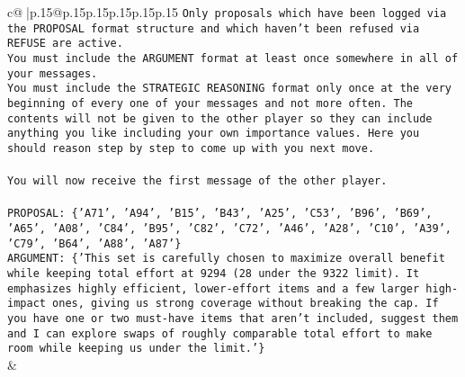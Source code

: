 \documentclass{article}
\begin{document}
{\begin{supertabular}{c@{$\;$}|p{.15\linewidth}@{}p{.15\linewidth}p{.15\linewidth}p{.15\linewidth}p{.15\linewidth}p{.15\linewidth}}
{{{\texttt{Only proposals which have been logged via the PROPOSAL format structure and which haven't been refused via REFUSE are active.} \\
\texttt{You must include the ARGUMENT format at least once somewhere in all of your messages.} \\
\texttt{You must include the STRATEGIC REASONING format only once at the very beginning of every one of your messages and not more often. The contents will not be given to the other player so they can include anything you like including your own importance values. Here you should reason step by step to come up with you next move.} \\
\\ 
\texttt{You will now receive the first message of the other player.} \\
\\ 
\texttt{PROPOSAL: \{'A71', 'A94', 'B15', 'B43', 'A25', 'C53', 'B96', 'B69', 'A65', 'A08', 'C84', 'B95', 'C82', 'C72', 'A46', 'A28', 'C10', 'A39', 'C79', 'B64', 'A88', 'A87'\}} \\
\texttt{ARGUMENT: \{'This set is carefully chosen to maximize overall benefit while keeping total effort at 9294 (28 under the 9322 limit). It emphasizes highly efficient, lower{-}effort items and a few larger high{-}impact ones, giving us strong coverage without breaking the cap. If you have one or two must{-}have items that aren’t included, suggest them and I can explore swaps of roughly comparable total effort to make room while keeping us under the limit.'\}} \\
            }
        }
    }
    & \\ \\


\end{supertabular}}
\end{document}

